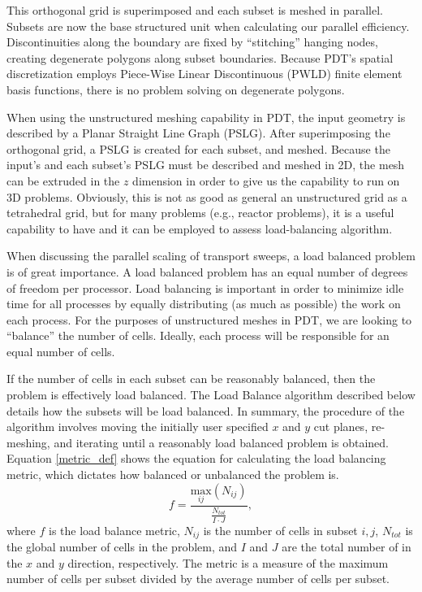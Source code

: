 \documentclass{anstrans}
\begin{document}
This orthogonal grid is superimposed and each subset is meshed in parallel.  Subsets are now the base structured unit when calculating our parallel efficiency. Discontinuities along the boundary are fixed by ``stitching'' hanging nodes, creating degenerate polygons along subset boundaries. Because PDT's spatial discretization employs Piece-Wise Linear Discontinuous (PWLD) finite element basis functions, there is no problem solving on degenerate polygons. 

When using the unstructured meshing capability in PDT, the input geometry is described by a Planar Straight Line Graph (PSLG)\cite{triangle}. After superimposing the orthogonal grid, a PSLG is created for each subset, and meshed. Because the input's and each subset's PSLG must be described and meshed in 2D, the mesh can be extruded in the $z$ dimension in order to give us the capability to run on 3D problems. Obviously, this is not as good as general an unstructured grid as a tetrahedral grid, but for many problems (e.g., reactor problems), it is a useful capability to have and it can be employed to assess load-balancing algorithm. 

When discussing the parallel scaling of transport sweeps, a load balanced problem is of great importance. A load balanced problem has an equal number of degrees of freedom per processor. Load balancing is important in order to minimize idle time for all processes by equally distributing (as much as possible) the work on each process.  For the purposes of unstructured meshes in PDT, we are looking to ``balance'' the number of cells. Ideally, each process will be responsible for an equal number of cells. 

If the number of cells in each subset can be reasonably balanced, then the problem is effectively load balanced. The Load Balance algorithm described below details how the subsets will be load balanced. In summary, the procedure of the algorithm involves moving the initially user specified $x$ and $y$ cut planes, re-meshing, and iterating until a reasonably load balanced problem is obtained.  Equation \ref{metric_def} shows the equation for calculating the load balancing metric, which dictates how balanced or unbalanced the problem is.
\begin{equation}
f =\frac{\underset{ij}{\text{max}}(N_{ij})}{\frac{N_{tot}}{I\cdot J}},
\label{metric_def}
\end{equation}
where $f$ is the load balance metric, $N_{ij}$ is the number of cells in subset $i,j$, $N_{tot}$ is the global number of cells in the problem, and $I$ and $J$ are the total number of in the $x$ and $y$ direction, respectively. The metric is a measure of the maximum number of cells per subset divided by the average number of cells per subset.
\end{document}
